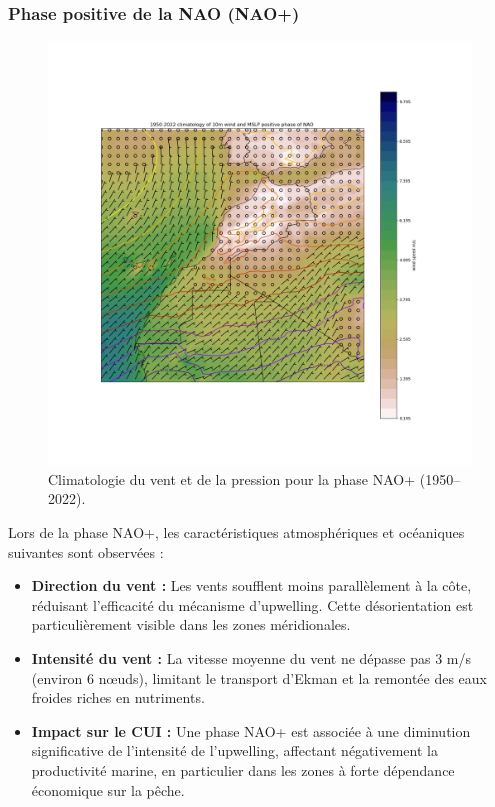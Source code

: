\subsubsection{Phase positive de la NAO (NAO+)}
\begin{figure}[H]
\centering
\includegraphics[scale=0.3]{POS_PHASE.png}
\caption{Climatologie du vent et de la pression pour la phase NAO+ (1950–2022).}
\label{fig:nao_positive}
\end{figure}

Lors de la phase NAO+, les caractéristiques atmosphériques et océaniques suivantes sont observées :
\begin{itemize}
    \item \textbf{Direction du vent :} Les vents soufflent moins parallèlement à la côte, réduisant l'efficacité du mécanisme d'upwelling. Cette désorientation est particulièrement visible dans les zones méridionales.
    \item \textbf{Intensité du vent :} La vitesse moyenne du vent ne dépasse pas 3 m/s (environ 6 nœuds), limitant le transport d'Ekman et la remontée des eaux froides riches en nutriments.
    \item \textbf{Impact sur le CUI :} Une phase NAO+ est associée à une diminution significative de l’intensité de l’upwelling, affectant négativement la productivité marine, en particulier dans les zones à forte dépendance économique sur la pêche.
\end{itemize}


